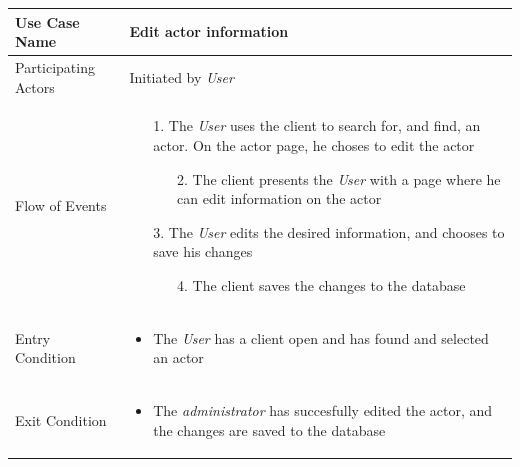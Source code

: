 \begin{center}
	\begin{tabular}{ | l | p{10cm} |  }
		 \hline
		Use Case Name & Edit actor information \\ \hline
		Participating Actors & Initiated by \emph{User} \\ \hline
		Flow of Events & \begin{enumerate}
						\item[1.] The \emph{User} uses the client to search for, and find, an actor. On the actor page, he choses to edit the actor
						\begin{enumerate}
							\item[2.] The client presents the \emph{User} with a page where he can edit information on the actor
						\end{enumerate}
						\item[3.] The \emph{User} edits the desired information, and chooses to save his changes
						\begin{enumerate}
							\item[4.] The client saves the changes to the database
						\end{enumerate}
					\end{enumerate} \\ \hline
		Entry Condition & \begin{itemize}
						\item The \emph{User} has a client open and has found and selected an actor
					\end{itemize} \\ \hline
		Exit Condition & \begin{itemize}
						\item The \emph{administrator} has succesfully edited the actor, and the changes are saved to the database
					\end{itemize} \\
		\hline
	\end{tabular}
\end{center}



